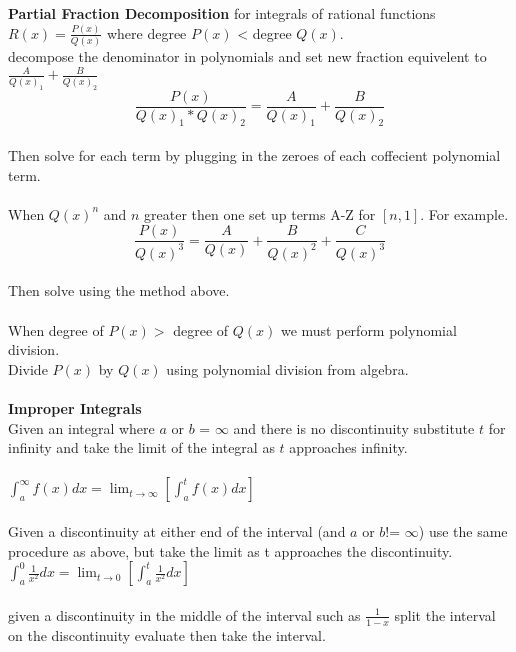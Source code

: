 \documentclass[14pt]{extreport}
\begin{document}
\textbf{Partial Fraction Decomposition}
for integrals of rational functions $R(x) = \frac{P(x)}{Q(x)}$ where degree $P(x)$ < degree $Q(x)$.\\
decompose the denominator in polynomials and set new fraction equivelent to $\frac{A}{Q(x)_1}+\frac{B}{Q(x)_2}$\\
$$\frac{P(x)}{Q(x)_1 * Q(x)_2} = \frac{A}{Q(x)_1}+\frac{B}{Q(x)_2}$$\\
Then solve for each term by plugging in the zeroes of each coffecient polynomial term.\\\\

When $Q(x)^n$ and $n$ greater then one set up terms A-Z for $[n,1]$. For example.\\
$$\frac{P(x)}{Q(x)^3} = \frac{A}{Q(x)} + \frac{B}{Q(x)^2} + \frac{C}{Q(x)^3}$$\\
Then solve using the method above.\\\\

When degree of $P(x) >$ degree of $Q(x)$ we must perform polynomial division.\\
Divide $P(x)$ by $Q(x)$ using polynomial division from algebra.\\\\

\textbf{Improper Integrals}\\
Given an integral where $a$ or $b$ = $\infty$ and there is no discontinuity substitute $t$ for infinity and take the limit of the integral as $t$ approaches infinity.\\\\

$\int_{a}^{\infty} f(x)dx = \lim_{t \to \infty} [\int_{a}^{t} f(x)dx]$\\\\

Given a discontinuity at either end of the interval (and $a$ or $b$!= $\infty$) use the same procedure as above, but take the limit as t approaches the discontinuity.\\
$\int_{a}^{0} \frac{1}{x^2}dx = \lim_{t \to 0} [\int_{a}^{t} \frac{1}{x^2}dx]$\\\\

given a discontinuity in the middle of the interval such as $\frac{1}{1-x}$ split the interval on the discontinuity evaluate then take the interval.\\\\
\end{document}

